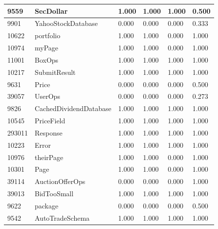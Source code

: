 \documentclass[a4paper]{article}
\newlength{\DUtablewidth} %
\begin{document}
\begin{longtable*}[c]{|p{0.160\DUtablewidth}|p{0.160\DUtablewidth}|p{0.160\DUtablewidth}|p{0.160\DUtablewidth}|p{0.160\DUtablewidth}|p{0.160\DUtablewidth}|}
9559
 & 
SecDollar
 & 
1.000
 & 
1.000
 & 
1.000
 & 
0.500
 \\
\hline

9901
 & 
YahooStockDatabase
 & 
0.000
 & 
0.000
 & 
0.000
 & 
0.333
 \\
\hline

10622
 & 
portfolio
 & 
1.000
 & 
1.000
 & 
0.000
 & 
1.000
 \\
\hline

10974
 & 
myPage
 & 
1.000
 & 
1.000
 & 
0.000
 & 
1.000
 \\
\hline

11001
 & 
BoxOps
 & 
1.000
 & 
1.000
 & 
1.000
 & 
1.000
 \\
\hline

10217
 & 
SubmitResult
 & 
1.000
 & 
1.000
 & 
1.000
 & 
1.000
 \\
\hline

9631
 & 
Price
 & 
0.000
 & 
0.000
 & 
0.000
 & 
0.500
 \\
\hline

39057
 & 
UserOps
 & 
0.000
 & 
0.000
 & 
0.000
 & 
0.273
 \\
\hline

9826
 & 
CachedDividendDatabase
 & 
1.000
 & 
1.000
 & 
1.000
 & 
1.000
 \\
\hline

10545
 & 
PriceField
 & 
1.000
 & 
1.000
 & 
1.000
 & 
1.000
 \\
\hline

293011
 & 
Response
 & 
1.000
 & 
1.000
 & 
1.000
 & 
1.000
 \\
\hline

10223
 & 
Error
 & 
1.000
 & 
1.000
 & 
1.000
 & 
1.000
 \\
\hline

10976
 & 
theirPage
 & 
1.000
 & 
1.000
 & 
0.000
 & 
1.000
 \\
\hline

10301
 & 
Page
 & 
1.000
 & 
1.000
 & 
0.000
 & 
1.000
 \\
\hline

39114
 & 
AuctionOfferOps
 & 
0.000
 & 
0.000
 & 
0.000
 & 
1.000
 \\
\hline

39013
 & 
BidTooSmall
 & 
1.000
 & 
1.000
 & 
1.000
 & 
1.000
 \\
\hline

9622
 & 
package
 & 
0.000
 & 
0.000
 & 
0.000
 & 
0.500
 \\
\hline

9542
 & 
AutoTradeSchema
 & 
1.000
 & 
1.000
 & 
1.000
 & 
1.000
 \\
\hline


\end{longtable*}
\end{document}
